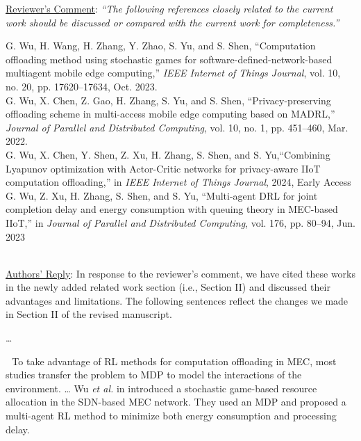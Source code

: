 \documentclass[12pt,draftclsnofoot,onecolumn]{IEEEtran}
\newcommand{\rev}[1]{{\color{blue}#1}} %
\newcommand{\rev}[1]{#1}
\newenvironment{my}[2]%
{\begin{list}{}%
{\setlength{\rightmargin}{#1}\setlength{\leftmargin}{#2}}%


 \item[]{}

} {\end{list}}
\begin{document}
\begin{enumerate}
	\item \underline{Reviewer's Comment}: 
	\textit{``The following references closely related to the current work should be discussed or compared with the current work for completeness.''} \newline
		\begin{my}{1cm}{1cm}
		\rev{
			{\small
				\noindent\hspace{-0.5mm}\cite{wu2023computation} G. Wu, H. Wang, H. Zhang, Y. Zhao, S. Yu, and S. Shen, ``Computation offloading method using stochastic games for software-defined-network-based multiagent mobile edge computing,'' \textit{IEEE Internet of Things Journal}, vol. 10, no. 20, pp. 17620–17634, Oct. 2023.\\[6pt]
				\cite{wu2024privacy} G. Wu, X. Chen, Z. Gao, H. Zhang, S. Yu, and S. Shen, ``Privacy-preserving offloading scheme in multi-access mobile edge computing based on MADRL,'' \textit{Journal of Parallel and Distributed Computing}, vol. 10, no. 1, pp. 451--460, Mar. 2022.\\[6pt]
				\cite{wu2024combining}  G. Wu, X. Chen, Y. Shen, Z. Xu, H. Zhang, S. Shen, and S. Yu,``Combining Lyapunov optimization with Actor-Critic networks for privacy-aware IIoT computation offloading,'' in \textit{IEEE Internet of Things Journal}, 2024, Early Access\\[6pt]
				\cite{wu2023multi} G. Wu, Z. Xu, H. Zhang, S. Shen, and S. Yu,  ``Multi-agent DRL for joint completion delay and energy consumption with queuing theory in MEC-based IIoT,'' in \textit{Journal of Parallel and Distributed Computing}, vol. 176, pp. 80–94, Jun. 2023\\[6pt]}\\}
	\end{my}

	\underline{Authors' Reply}: In response to the reviewer's comment, we have cited these works in the newly added related work section (i.e., Section II) and discussed their advantages and limitations. The following sentences reflect the changes we made in Section II of the revised manuscript.
	
	\begin{my}{1cm}{1cm}
		\rev{
			{
				

				
				\dots
				
				\,\,\,\,To take advantage of RL methods for computation offloading in MEC, most studies transfer the problem to MDP to model the interactions of the environment.
				\dots
				Wu \textit{et al.} in \cite{wu2023computation} introduced a stochastic game-based resource allocation in the SDN-based MEC network. They used an MDP and proposed a multi-agent RL method to minimize both energy consumption and processing delay. 
				
}}
\end{my}
\end{enumerate}
\end{document}
